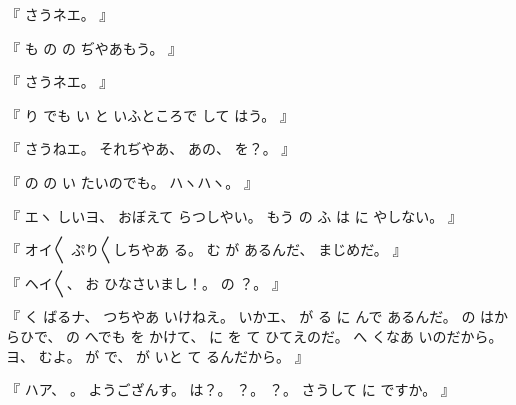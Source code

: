 %
『
さうネエ。
』

%
『
も
の
の
ぢやあもう。
』

%
『
さうネエ。
』

%
『
り
でも
い
と
いふところで
して%
はう。
』

%
『
さうねエ。
%
それぢやあ、
%
あの、
%
を？。
』

%
『
の
の%
い
たいのでも。
%
ハヽハヽ。
』

%
『
エヽ
しいヨ、
%
おぼえて
らつしやい。
%
もう
の
ふ
は
に
やしない。
』

%
『
オイ〳〵
ぷり〳〵しちやあ
る。
%
む
が
あるんだ、
%
まじめだ。
』

%
『
ヘイ〳〵、
%
お
ひなさいまし！。
%
の
？。
』

%
『
く
ばるナ、
%
つちやあ
いけねえ。
%
いかエ、
%
が
る
に
んで
あるんだ。
%
の
はからひで、
%
の
へでも
を
かけて、
%
に
を
て
ひてえのだ。
%
へ
くなあ
いのだから。
%
ヨ、
%
むよ。
%
が
で、
%
が
いと
て
%
るんだから。
』

%
『
ハア、
%
。
%
ようござんす。
%
は？。
%
？。
%
？。
%
%
さうして
に
ですか。%
』

